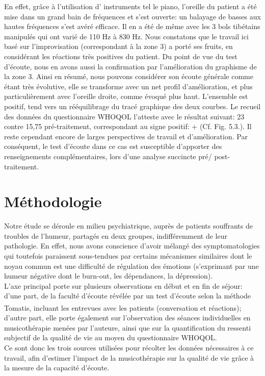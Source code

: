  En effet, 
 grâce à l'utilisation d' instruments tel le piano,  l'oreille du patient a été mise dans un grand bain de 
 fréquences 
 et  s'est ouverte: un balayage 
 de  basses aux hautes fréquences s'est avéré efficace. Il en a été de même avec les 3 bols tibétains 
 manipulés 
 qui ont varié de 110 Hz à 830 Hz.
 Nous constatons que le travail ici  basé sur l'improvisation (correspondant à la zone 3) a porté ses fruits, 
 en considérant les 
 réactions très positives du patient. 
 Du point de vue du test d'écoute, nous en avons aussi  la confirmation par l'amélioration du  graphisme 
 de la zone 3.
Ainsi en résumé, nous pouvons considérer son écoute générale comme étant très évolutive, elle se 
transforme avec un net profil 
d'amélioration, et 
plus particulièrement avec l'oreille
droite, comme évoqué plus haut. L'ensemble est positif, tend vers un
rééquilibrage du tracé graphique des deux courbes. Le recueil des données du
questionnaire WHOQOL l'atteste avec le résultat suivant: 23 contre 15,75 pré-traitement, correspondant
au signe positif: $+$ (Cf. Fig. 5.3.).
Il reste cependant encore de larges perspectives de travail et d'amélioration.
Par conséquent, le test d'écoute dans ce cas est susceptible d'apporter des renseignements 
complémentaires, lors
d'une analyse succincte pré/ post-traitement.


\chapter{Méthodologie} 

Notre étude se déroule en milieu psychiatrique, 
auprès de patients souffrants de troubles de l'humeur, partagés en deux groupes, indifféremment de leur 
pathologie. En effet, nous avons conscience d'avoir mélangé des symptomatologies qui toutefois 
paraissent sous-tendues par certains mécanismes similaires dont le noyau commun est une difficulté 
de	
régulation des émotions (s'exprimant  par une humeur négative dont le burn-out, les dépendances, la 
dépression).
\\
L'axe principal  porte  sur plusieurs observations en début et en fin de séjour: d'une part, de la faculté 
d'écoute révélée par un test 
d'écoute selon la méthode Tomatis\textsuperscript \textregistered, incluant les entrevues avec les 
patients (conversation et réactions);  %
d'autre part, elle porte également sur  l'observation
des séances individuelles en 
musicothérapie menées par l'auteure, ainsi que  sur la 
quantification du ressenti subjectif de la qualité de vie au moyen du 
questionnaire WHOQOL. 
\\
Ce sont donc les trois sources utilisées pour récolter les données nécessaires à 
ce 
travail, afin d'estimer l'impact de la musicothérapie sur la qualité de vie grâce à la mesure de la capacité 
d'écoute.

